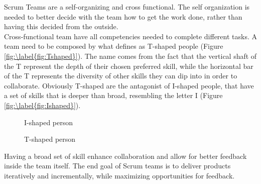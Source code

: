 \documentclass[../main.tex]{subfiles}
\begin{document}
Scrum Teams are a self-organizing and cross functional. The self organization is needed to better decide with the team how to get the work done, rather than having this decided from the outside.\\
Cross-functional team have all competencies needed to complete different tasks. A team need to be composed by what \citeauthor{Scrumastery} \cite{Scrumastery} defines as T-shaped people (Figure \ref{fig:\label{fig:Tshaped}}). The name comes from the fact that the vertical shaft of the T represent the depth of their chosen preferred skill, while the horizontal bar of the T represents the diversity of other skills they can dip into in order to collaborate. Obviously T-shaped are the antagonist of I-shaped people, that have a set of skills that is deeper than broad, resembling the letter I (Figure \ref{fig:\label{fig:Ishaped}}).\\
\begin{figure}[H]
\centering
\begin{minipage}{.5\textwidth}
  \centering

  \caption{I-shaped person}
  \label{fig:Ishaped}
\end{minipage}%
\begin{minipage}{.5\textwidth}
  \centering
{} %
  \caption{T-shaped person}
  \label{fig:Tshaped}
\end{minipage}
\end{figure}
Having a broad set of skill enhance collaboration and allow for better feedback inside the team itself. The end goal of Scrum teams is to deliver products iteratively and incrementally, while maximizing opportunities for feedback.
\end{document}
